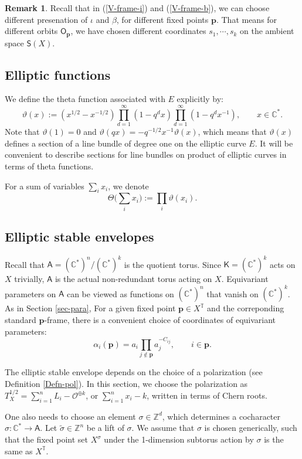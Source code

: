 \documentclass[10pt]{amsart}
\theoremstyle{definition}
\def\ZZ{{\mathbb{Z}}}
\def\CC{{\mathbb{C}}}
\def\TT{\mathbb{T}}
\newcommand{\bp}{\mathbf{p}}
\newcommand{\Or}{\mathsf{O}}
\newcommand{\cO}{\mathcal{O}}
\newcommand{\bA}{\mathsf{A}}
\newcommand{\bS}{\mathsf{S}}
\newcommand{\bK}{\mathsf{K}}
\theoremstyle{definition}
\newtheorem{Remark}[Definition]{Remark}
\numberwithin{equation}{section}
\theoremstyle{Theorem}
\begin{document}
\begin{Remark}
	Recall that in (\ref{V-frame-i}) and (\ref{V-frame-b}), we can choose different presenation of $\iota$ and $\beta$, for different fixed points $\bp$. That means for different orbits $\Or_\bp$, we have chosen different coordinates $s_1, \cdots, s_k$ on the ambient space $\bS (X)$.
\end{Remark}

\subsection{Elliptic functions}

We define the theta function associated with $E$ explicitly by:
$$
\vartheta (x) := (x^{1/2} - x^{-1/2} ) \prod_{d=1}^\infty (1 - q^d x) \prod_{d=1}^\infty ( 1- q^d x^{-1} ), \qquad x \in \CC^*.
$$
Note that $\vartheta (1) = 0$ and $\vartheta (qx) = - q^{-1/2} x^{-1} \vartheta (x)$, which means that $\vartheta (x)$ defines a section of a line bundle of degree one on the elliptic curve $E$. It will be convenient to describe sections for line bundles on product of elliptic curves in terms of theta functions.

For a sum of variables $\sum_i x_i$, we denote
$$
\Theta \Big( \sum_i x_i \Big) := \prod_i \vartheta (x_i).
$$


\subsection{Elliptic stable envelopes}

Recall that $\bA= (\CC^*)^n / (\CC^*)^k$ is the quotient torus. Since $\bK = (\CC^*)^k$ acts on $X$ trivially, $\bA$ is the actual non-redundant torus acting on $X$. Equivariant parameters on $\bA$ can be viewed as functions on $(\CC^*)^n$ that vanish on $(\CC^*)^k$. As in Section \ref{sec-para}, For a given fixed point $\bp \in X^\TT$ and the correponding standard $\bp$-frame, there is a convenient choice of coordinates of equivariant parameters:
$$
\alpha_i (\bp) = a_i \prod_{j\not\in \bp} a_j^{-C_{ij}}, \qquad i\in \bp .
$$


The elliptic stable envelope depends on the  choice of a polarization (see Definition \ref{Defn-pol}). In this section, we choose the polarization as $T^{1/2}_X = \sum_{i=1}^n L_i - \cO^{\oplus k}$, or $\sum_{i=1}^n x_i - k$, written in terms of Chern roots.

One also needs to choose an element $\sigma \in \ZZ^d$, which determines a cocharacter $\sigma: \CC^* \to \bA$. Let $\widetilde\sigma \in \ZZ^n$ be a lift of $\sigma$. We assume that $\sigma$ is chosen generically, such that the fixed point set $X^\sigma$ under the 1-dimension subtorus action by $\sigma$ is the same as $X^\TT$.
\end{document}
